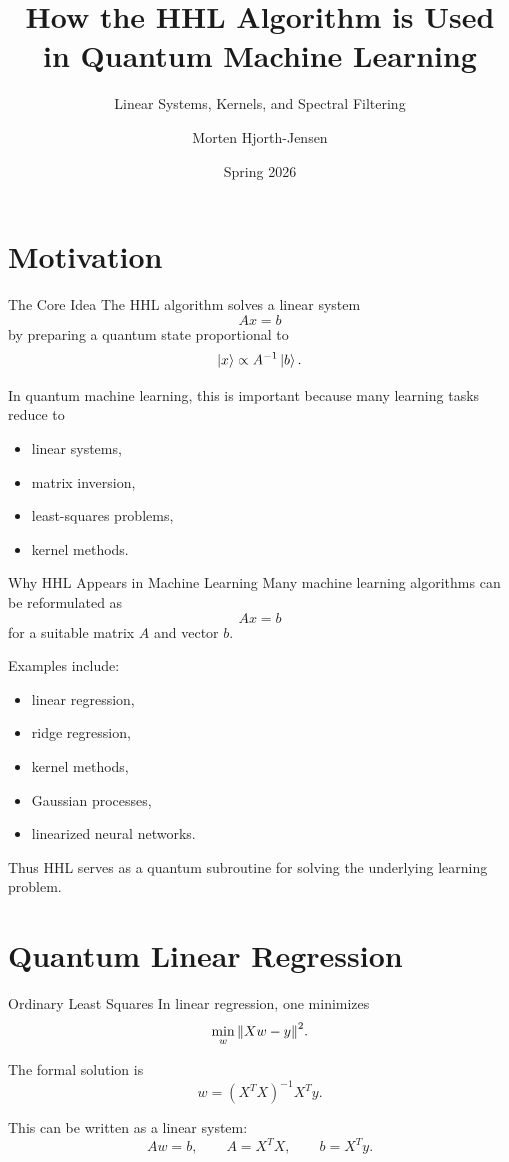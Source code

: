 \documentclass{beamer}
\title{How the HHL Algorithm is Used in Quantum Machine Learning}
\subtitle{Linear Systems, Kernels, and Spectral Filtering}
\author{Morten Hjorth-Jensen}
\date{Spring 2026}
\begin{document}
\frame{\titlepage}

\section{Motivation}

\begin{frame}{The Core Idea}
The HHL algorithm solves a linear system
\[
A x = b
\]
by preparing a quantum state proportional to
\[
\ket{x} \propto A^{-1}\ket{b}.
\]

In quantum machine learning, this is important because many learning tasks reduce to
\begin{itemize}
\item linear systems,
\item matrix inversion,
\item least-squares problems,
\item kernel methods.
\end{itemize}
\end{frame}


\begin{frame}{Why HHL Appears in Machine Learning}
Many machine learning algorithms can be reformulated as
\[
A x = b
\]
for a suitable matrix \(A\) and vector \(b\).

Examples include:
\begin{itemize}
\item linear regression,
\item ridge regression,
\item kernel methods,
\item Gaussian processes,
\item linearized neural networks.
\end{itemize}

Thus HHL serves as a quantum subroutine for solving the underlying learning problem.
\end{frame}

\section{Quantum Linear Regression}

\begin{frame}{Ordinary Least Squares}
In linear regression, one minimizes
\[
\min_w \norm{Xw - y}^2.
\]

The formal solution is
\[
w = (X^T X)^{-1} X^T y.
\]

This can be written as a linear system:
\[
A w = b,
\qquad
A = X^T X,
\qquad
b = X^T y.
\]
\end{frame}
\end{document}
